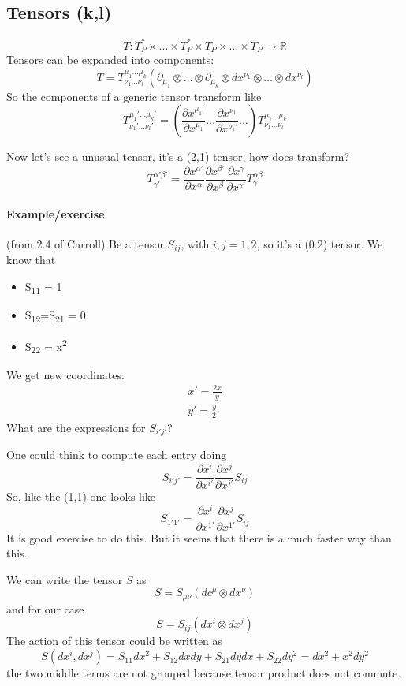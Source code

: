 \subsection{Tensors (k,l)}
\[
T : T_{P}^{*}\times \ldots \times T_{P}^{*} \times T_{P}\times \ldots \times T_{P}\to \mathbb{R}
\]
Tensors can be expanded into components:
\[
T = T^{\mu_{1}\ldots \mu_{k}}_{\nu_{1}\ldots \nu_{l}} \left( \partial_{\mu_{1}} \otimes \ldots \otimes \partial_{\mu_{k}} \otimes dx^{\nu_{1}} \otimes \ldots \otimes dx^{\nu_{l}} \right)
\]
So the components of a generic tensor transform like
\[
T^{\mu_{1}' \ldots \mu_{k}'}_{\nu_{1}' \ldots \nu_{l}'} = \left( \frac{\partial x^{\mu_{1}'}}{\partial x^{\mu_{1}}} \ldots \frac{\partial x^{\nu_{1}}}{\partial x^{\nu_{1}'}}\ldots  \right) T^{\mu_{1}\ldots \mu_{k}}_{\nu_{1}\ldots \nu_{l}}
\]

Now let's see a unusual tensor, it's a (2,1) tensor, how does transform?
\[
T^{\alpha' \beta'}_{\gamma'} = \frac{\partial x^{\alpha '}}{\partial x^{\alpha }} \frac{\partial x^{\beta '}}{\partial x^{\beta }} \frac{\partial x^{\gamma }}{\partial x^{\gamma '}} T^{\alpha \beta }_{\gamma }	 
\]
\paragraph{Example/exercise} (from 2.4 of Carroll)
Be a tensor $S_{ij}$, with $i,j =1,2$, so it's a (0.2) tensor.
We know that
\begin{itemize}
	\item S\textsubscript{11} = 1
	\item S\textsubscript{12}=S\textsubscript{21} = 0
	\item S\textsubscript{22} = x\textsuperscript{2}
\end{itemize}
We get new coordinates:
\begin{gather*}
x' = \frac{2x}{y} \\
y' = \frac{y}{2}
\end{gather*}
What are the expressions for $S_{i'j'}$?\par
One could think to compute each entry doing
\[
S_{i'j'}= \frac{\partial x^{i}}{\partial x^{i'}} \frac{\partial x^{j}}{\partial x^{j'}} S_{ij}
\]
So, like the (1,1) one looks like
\[
S_{1'1'} = \frac{\partial x^{i}}{\partial x^{1'}} \frac{\partial x^{j}}{\partial x^{1'}} S_{ij}
\]
It is good exercise to do this.
But it seems that there is a much faster way than this.\par
We can write the tensor $S$ as
\[
S = S_{\mu \nu }\left( dc^{\mu } \otimes dx^{\nu } \right)
\]
and for our case 
\[
S = S_{ij}\left( dx^{i} \otimes dx^{j} \right)
\]
The action of this tensor could be written as 
\begin{equation}\label{eq:1}
S \left( dx^{i},dx^{j} \right) = S_{11}dx^{2} + S_{12}dxdy + S_{21}dydx + S_{22}dy^{2} = dx^{2} +x^{2}dy^{2}		
\end{equation}
the two middle terms are not grouped because tensor product does not commute.\par

